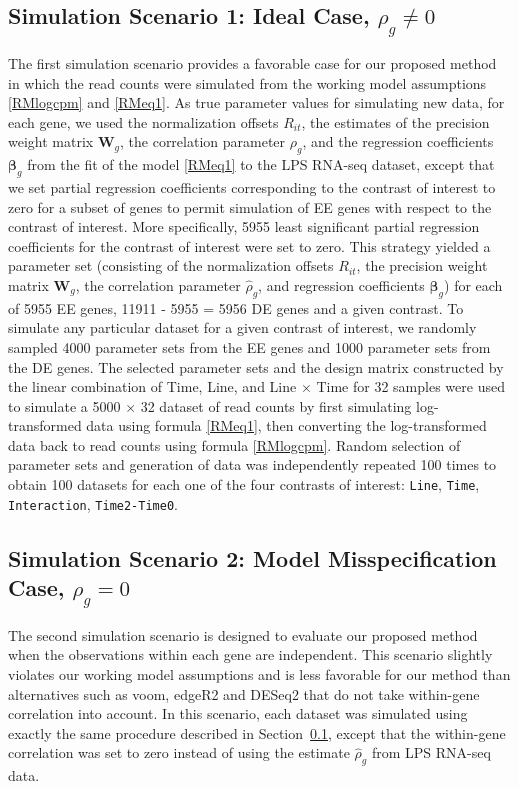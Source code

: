 \subsection{Simulation Scenario 1:  Ideal Case, $\rho_g \neq 0$}\label{RMss1}
The first simulation scenario provides a favorable case for our proposed method in which the read counts were simulated from the working model assumptions \eqref{RMlogcpm} and \eqref{RMeq1}. As true parameter values for simulating new data, for each gene, we used the normalization offsets  $R_{it}$, the  estimates of the precision weight matrix $\boldsymbol{W}_g$, the correlation parameter  $\rho_g$, and the regression coefficients $\boldsymbol{\beta}_g$ from the fit of the model \eqref{RMeq1} to the LPS RNA-seq dataset, except that we set partial regression coefficients corresponding to the contrast of interest to zero for a subset of genes to permit simulation of EE genes with respect to the contrast of interest. More specifically, 5955 least significant partial regression coefficients for the contrast of interest were set to zero. This strategy yielded a parameter set (consisting of the  normalization offsets $R_{it}$, the precision weight matrix $\boldsymbol{W}_g$,  the correlation parameter $\widehat{\rho}_g$, and  regression coefficients $\boldsymbol{\beta}_g$) for each of 5955 EE genes, 11911 - 5955 = 5956 DE genes and a given contrast. To simulate any particular dataset for a given contrast of interest, we randomly sampled 4000 parameter sets from the EE genes and 1000 parameter sets from the DE genes. The selected parameter sets  and the design matrix constructed by the linear combination of  Time, Line, and Line $\times$ Time for 32 samples were used to simulate a 5000 $\times$ 32 dataset of read counts by first simulating log-transformed data using formula \eqref{RMeq1}, then converting the  log-transformed data back to read counts using formula \eqref{RMlogcpm}. Random selection of parameter sets and generation of data was independently repeated 100 times to obtain 100 datasets for each one of the four contrasts of interest: \texttt{Line}, \texttt{Time}, \texttt{Interaction}, \texttt{Time2-Time0}.

\subsection{Simulation Scenario 2: Model Misspecification Case, $\rho_g = 0$ }\label{RMss2}
The second simulation scenario is designed to evaluate our proposed method when the observations within each gene are independent. This scenario slightly violates our working model assumptions and is less favorable for our method than alternatives such as  voom, edgeR2 and DESeq2 that do not take within-gene correlation into account. In this  scenario, each dataset was simulated using exactly the same procedure described in Section~\ref{RMss1}, except that the within-gene correlation was set to zero instead of using the estimate $\widehat{\rho}_g$ from LPS RNA-seq data.

